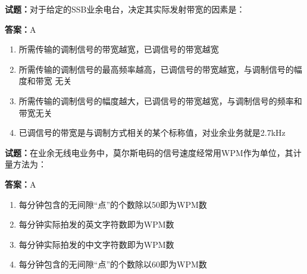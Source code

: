 \documentclass{ctexbook}
\begin{document}




\vspace{1em}

\textbf{试题：}对于给定的SSB业余电台，决定其实际发射带宽的因素是： 

\textbf{答案：}A 

\begin{enumerate}[leftmargin=3em]
  \item 所需传输的调制信号的带宽越宽，已调信号的带宽越宽 

  \item 所需传输的调制信号的最高频率越高，已调信号的带宽越宽，与调制信号的幅度和带宽
无关 

  \item 所需传输的调制信号的幅度越大，已调信号的带宽越宽，与调制信号的频率和带宽无关 

  \item 已调信号的带宽是与调制方式相关的某个标称值，对业余业务就是2.7kHz 

\end{enumerate}






\vspace{1em}

\textbf{试题：}在业余无线电业务中，莫尔斯电码的信号速度经常用WPM作为单位，其计量方法为： 

\textbf{答案：}A 

\begin{enumerate}[leftmargin=3em]
  \item 每分钟包含的无间隙“点”的个数除以50即为WPM数 

  \item 每分钟实际拍发的英文字符数即为WPM数 

  \item 每分钟实际拍发的中文字符数即为WPM数 

  \item 每分钟包含的无间隙“点”的个数除以60即为WPM数 

\end{enumerate}





\vspace{1em}
\end{document}
